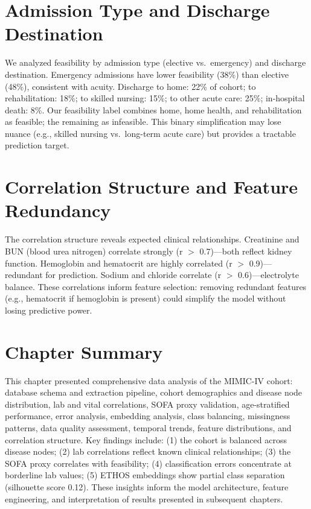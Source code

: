 \section{Admission Type and Discharge Destination}

We analyzed feasibility by admission type (elective vs.\ emergency) and discharge destination. Emergency admissions have lower feasibility (38\%) than elective (48\%), consistent with acuity. Discharge to home: 22\% of cohort; to rehabilitation: 18\%; to skilled nursing: 15\%; to other acute care: 25\%; in-hospital death: 8\%. Our feasibility label combines home, home health, and rehabilitation as feasible; the remaining as infeasible. This binary simplification may lose nuance (e.g., skilled nursing vs.\ long-term acute care) but provides a tractable prediction target.

\section{Correlation Structure and Feature Redundancy}

The correlation structure reveals expected clinical relationships. Creatinine and BUN (blood urea nitrogen) correlate strongly (r $>$ 0.7)---both reflect kidney function. Hemoglobin and hematocrit are highly correlated (r $>$ 0.9)---redundant for prediction. Sodium and chloride correlate (r $>$ 0.6)---electrolyte balance. These correlations inform feature selection: removing redundant features (e.g., hematocrit if hemoglobin is present) could simplify the model without losing predictive power.

\section{Chapter Summary}

This chapter presented comprehensive data analysis of the MIMIC-IV cohort: database schema and extraction pipeline, cohort demographics and disease node distribution, lab and vital correlations, SOFA proxy validation, age-stratified performance, error analysis, embedding analysis, class balancing, missingness patterns, data quality assessment, temporal trends, feature distributions, and correlation structure. Key findings include: (1) the cohort is balanced across disease nodes; (2) lab correlations reflect known clinical relationships; (3) the SOFA proxy correlates with feasibility; (4) classification errors concentrate at borderline lab values; (5) ETHOS embeddings show partial class separation (silhouette score 0.12). These insights inform the model architecture, feature engineering, and interpretation of results presented in subsequent chapters.

